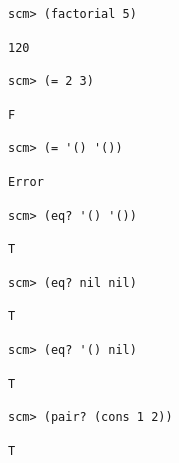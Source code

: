 \documentclass{exam}
\begin{document}
\begin{questions}
\begin{blocksection}
\begin{lstlisting}
scm> (factorial 5)
\end{lstlisting}
\begin{solution}[.25in]
\begin{lstlisting}
120
\end{lstlisting}
\end{solution}

\begin{lstlisting}
scm> (= 2 3)
\end{lstlisting}
\begin{solution}[.25in]
\begin{lstlisting}
F
\end{lstlisting}
\end{solution}

\begin{lstlisting}
scm> (= '() '())
\end{lstlisting}
\begin{solution}[.25in]
\begin{lstlisting}
Error
\end{lstlisting}
\end{solution}

\begin{lstlisting}
scm> (eq? '() '())
\end{lstlisting}
\begin{solution}[.25in]
\begin{lstlisting}
T
\end{lstlisting}
\end{solution}

\begin{lstlisting}
scm> (eq? nil nil)
\end{lstlisting}
\begin{solution}[.25in]
\begin{lstlisting}
T
\end{lstlisting}
\end{solution}

\begin{lstlisting}
scm> (eq? '() nil)
\end{lstlisting}
\begin{solution}[.25in]
\begin{lstlisting}
T
\end{lstlisting}
\end{solution}

\begin{lstlisting}
scm> (pair? (cons 1 2))
\end{lstlisting}
\begin{solution}[.25in]
\begin{lstlisting}
T
\end{lstlisting}
\end{solution}


\end{blocksection}
\end{questions}
\end{document}
